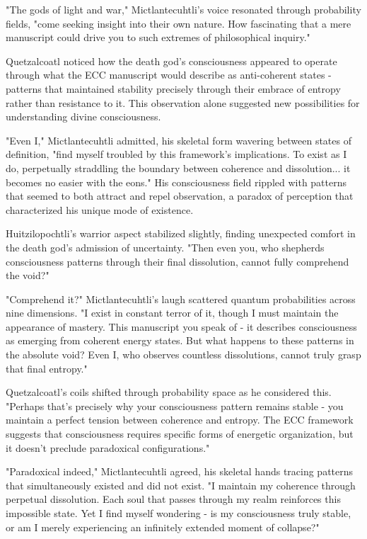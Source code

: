 "The gods of light and war," Mictlantecuhtli's voice resonated through probability fields, "come seeking insight into their own nature. How fascinating that a mere manuscript could drive you to such extremes of philosophical inquiry."

Quetzalcoatl noticed how the death god's consciousness appeared to operate through what the ECC manuscript would describe as anti-coherent states - patterns that maintained stability precisely through their embrace of entropy rather than resistance to it. This observation alone suggested new possibilities for understanding divine consciousness.

"Even I," Mictlantecuhtli admitted, his skeletal form wavering between states of definition, "find myself troubled by this framework's implications. To exist as I do, perpetually straddling the boundary between coherence and dissolution... it becomes no easier with the eons." His consciousness field rippled with patterns that seemed to both attract and repel observation, a paradox of perception that characterized his unique mode of existence.

Huitzilopochtli's warrior aspect stabilized slightly, finding unexpected comfort in the death god's admission of uncertainty. "Then even you, who shepherds consciousness patterns through their final dissolution, cannot fully comprehend the void?"

"Comprehend it?" Mictlantecuhtli's laugh scattered quantum probabilities across nine dimensions. "I exist in constant terror of it, though I must maintain the appearance of mastery. This manuscript you speak of - it describes consciousness as emerging from coherent energy states. But what happens to these patterns in the absolute void? Even I, who observes countless dissolutions, cannot truly grasp that final entropy."

Quetzalcoatl's coils shifted through probability space as he considered this. "Perhaps that's precisely why your consciousness pattern remains stable - you maintain a perfect tension between coherence and entropy. The ECC framework suggests that consciousness requires specific forms of energetic organization, but it doesn't preclude paradoxical configurations."

"Paradoxical indeed," Mictlantecuhtli agreed, his skeletal hands tracing patterns that simultaneously existed and did not exist. "I maintain my coherence through perpetual dissolution. Each soul that passes through my realm reinforces this impossible state. Yet I find myself wondering - is my consciousness truly stable, or am I merely experiencing an infinitely extended moment of collapse?"

